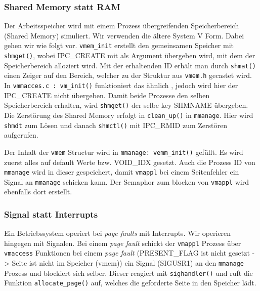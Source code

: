 \documentclass[
   draft=false
  ,paper=a4
  ,twoside=false
  ,fontsize=11pt
  ,headsepline
  ,BCOR10mm
  ,DIV11
  ,parskip=full+
]{scrartcl} %
\begin{document}
        \subsubsection{Shared Memory statt RAM}
        Der Arbeitsspeicher wird mit einem Prozess übergreifenden 
        Speicherbereich (Shared Memory) simuliert.
        Wir verwenden die ältere System V Form. Dabei gehen wir wie folgt vor.
        \texttt{vmem\_init} erstellt den gemeinsamen Speicher mit 
        \texttt{shmget()}, wobei IPC\_CREATE mit als Argument übergeben wird,
        mit dem der Speicherbereich alloziert wird. Mit der erhaltenden ID 
        erhält man durch \texttt{shmat()} einen Zeiger auf den Bereich, welcher
        zu der Struktur aus \texttt{vmem.h} gecastet wird. 
        In \texttt{vmmacces.c : vm\_init()} funktioniert das ähnlich , jedoch 
        wird hier der IPC\_CREATE nicht übergeben. Damit beide Prozesse den 
        selben Speicherbereich erhalten, wird \texttt{shmget()} der selbe 
        key SHMNAME übergeben.
        Die Zerstörung des Shared Memory erfolgt in \texttt{clean\_up()} in 
        \texttt{mmanage}. Hier wird \texttt{shmdt} zum Lösen und danach 
        \texttt{shmctl()} mit IPC\_RMID  zum Zerstören aufgerufen.
        
        Der Inhalt der \texttt{vmem} Structur wird in 
        \texttt{mmanage: vemm\_init()} gefüllt. Es wird zuerst alles auf 
        default Werte bzw. VOID\_IDX gesetzt. Auch die Prozess ID von 
        \texttt{mmanage} wird in dieser gespeichert, damit \texttt{vmappl} bei 
        einem Seitenfehler ein Signal an \texttt{mmanage} schicken kann.
        Der Semaphor zum blocken von \texttt{vmappl} wird ebenfalls dort 
        erstellt.

        \subsubsection{Signal statt Interrupts}
        Ein Betriebssystem operiert bei \textit{page faults} mit Interrupts. Wir
        operieren hingegen mit Signalen. Bei einem \textit{page fault} schickt
        der \texttt{vmappl} Prozess über \texttt{vmaccess} Funktionen bei einem
        \textit{page fault} (PRESENT\_FLAG ist nicht gesetzt -> Seite ist nicht
        im Speicher (vmem)) ein Signal (SIGUSR1) an den \texttt{mmanage} Prozess und 
        blockiert sich selber.  
        Dieser reagiert mit \texttt{sighandler()} und ruft die Funktion
        \texttt{allocate\_page()} auf, welches die geforderte Seite in den 
        Speicher lädt.
\end{document}
